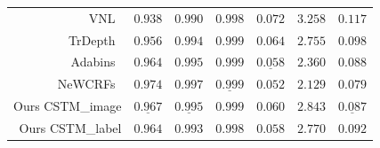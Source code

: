 \begin{table}[!t]
{\begin{tabular}{r |cccccc}
VNL~\cite{Yin2019enforcing} & ${0.938}$   & ${0.990}$   & ${0.998}$  & ${0.072}$  & $3.258$      & ${0.117}$    \\ 
TrDepth~\cite{yang2021transformers}   & $0.956$  & $0.994$  & $0.999$   & $0.064$  & $2.755$  & $0.098$  \\
Adabins~\cite{bhat2021adabins} & $0.964$  & $0.995$  & $0.999$   & $\underline{0.058}$  & $2.360$  & $0.088$  \\
NeWCRFs~\cite{yuan2022new} 
& $\boldsymbol{0.974}$  & $\boldsymbol{0.997}$  & $\underline{0.999}$   & $\boldsymbol{0.052}$  & $\boldsymbol{2.129}$  & $\boldsymbol{0.079}$  \\ \hline
Ours CSTM\_image & 
$\underline{0.967}$   & $\underline{0.995}$   & $\boldsymbol{0.999}$  
& $0.060$  & ${2.843}$     & $\underline{0.087}$    \\ 
Ours CSTM\_label 
& ${0.964}$   & ${0.993}$   & ${0.998}$  
& $0.058$  & ${2.770}$     & ${0.092}$    \\ \hline
\toprule[1pt]
\end{tabular}\newline}
\label{table:errors cmp on NYUD-V2}
\vspace{-2 em}
\end{table}






